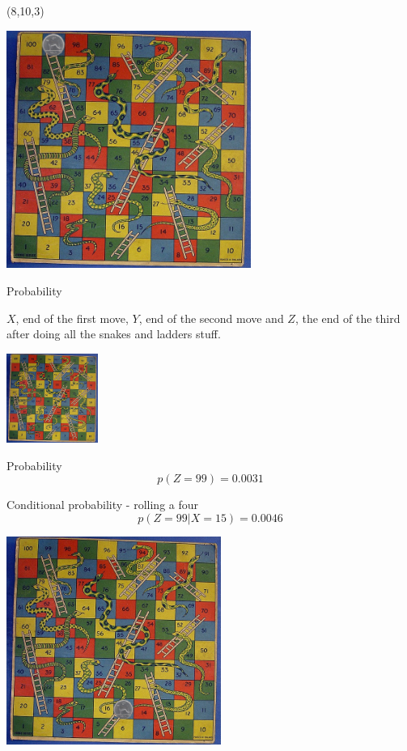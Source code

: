 \documentclass{beamer}
\newcommand{\crish}{\color{reddish}}
\newcommand{\cbla}{\color{black}}
\begin{document}
\begin{frame}{(8,10,3)}
  \begin{center}
    \includegraphics[width=8cm]{game99.jpg}
  \end{center}
    \vfill
\tiny{}
\end{frame}

\begin{frame}{Probability}

    \crish $X$\cbla, end of the first move, \crish $Y$\cbla, end of
    the second move and \crish$Z$\cbla{}, the end of the third after
    doing all the snakes and ladders stuff.
\vskip 1cm

  \begin{center}
    \includegraphics[width=3cm]{game.png}
  \end{center}
\end{frame}

\begin{frame}{Probability}
  \crish $$ p(Z=99)=0.0031 $$ \cbla
\end{frame}

\begin{frame}{Conditional probability - rolling a four}
    \crish $$ p(Z=99|X=15)=0.0046 $$ \cbla
  \begin{center}
    \includegraphics[width=7cm]{game15.jpg}
  \end{center}
\end{frame}
\end{document}
